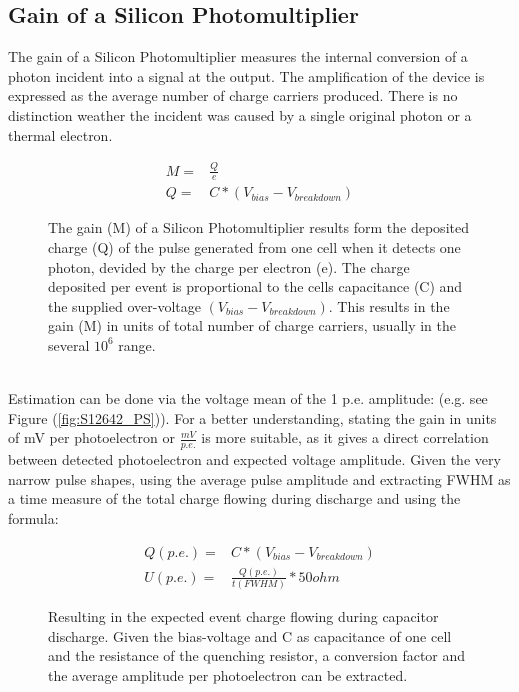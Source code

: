 \documentclass[12pt,article,type=msc,colorback,accentcolor=tud9c]{tudthesis}
\begin{document}
\subsection{Gain of a Silicon Photomultiplier}
\label{subsec:SiPMGain}
The gain of a Silicon Photomultiplier measures the internal conversion of a photon incident into a signal at the output. The amplification of the device is expressed as the average number of charge carriers produced. There is no distinction weather the incident was caused by a single original photon or a thermal electron.
\begin{figure}[h]
\begin{equation}\label{eq:1}
\begin{split}
M = & \frac{Q}{e} \\
Q = &  C * (V_{bias}-V_{breakdown})
\end{split}
\end{equation}
\label{fig:Gain_conversion_formula}
\caption{The gain (M) of a Silicon Photomultiplier results form the deposited charge (Q) of the pulse generated from one cell when it detects one photon, devided by the charge per electron (e). The charge deposited per event is proportional to the cells capacitance (C) and the supplied over-voltage $(V_{bias}-V_{breakdown})$. This results in the gain (M) in units of total number of charge carriers, usually in the several $10^6$ range.}
\end{figure}\\
Estimation can be done via the voltage mean of the 1 p.e. amplitude: (e.g. see Figure (\ref{fig:S12642_PS})). For a better understanding, stating the gain in units of mV per photoelectron or $\frac{mV}{p.e.}$ is more suitable, as it gives a direct correlation between detected photoelectron and expected voltage amplitude. Given the very narrow pulse shapes, using the average pulse amplitude and extracting FWHM as a time measure of the total charge flowing during discharge and using the formula:
\begin{figure}[h]
\begin{equation}
\begin{split}
Q(p.e.) = & C * (V_{bias}-V_{breakdown})\\
U(p.e.) = & \frac{Q(p.e.)}{t(FWHM)} * 50ohm
\end{split}
\end{equation}
\caption{Resulting in the expected event charge flowing during capacitor discharge. Given the bias-voltage and C as capacitance of one cell and the resistance of the quenching resistor, a conversion factor and the average amplitude per photoelectron can be extracted.}
\end{figure}\\
\end{document}
